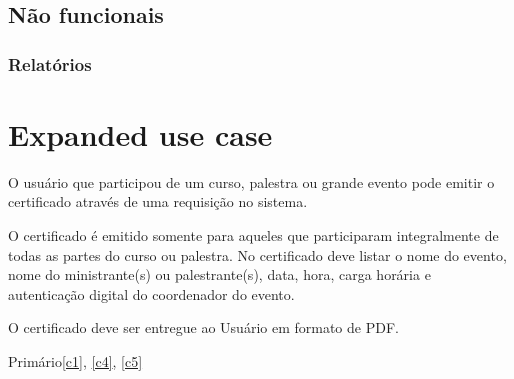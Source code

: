 \begin{hide}
\subsection{Não funcionais}
    \subsubsection{Relatórios}
        \label{r1}
\end{hide}

\setcounter{section}{1}
\section{Expanded use case}



{O usuário que participou de um curso, palestra ou grande evento pode emitir o certificado através de uma requisição no sistema.

O certificado é emitido somente para aqueles que participaram integralmente de todas as partes do curso ou palestra. No certificado deve listar o nome do evento, nome do ministrante(s) ou palestrante(s), data, hora, carga horária e autenticação digital do coordenador do evento.

O certificado deve ser entregue ao Usuário em formato de PDF.
}
{Primário}{\ref{c1}, \ref{c4}, \ref{c5}}

